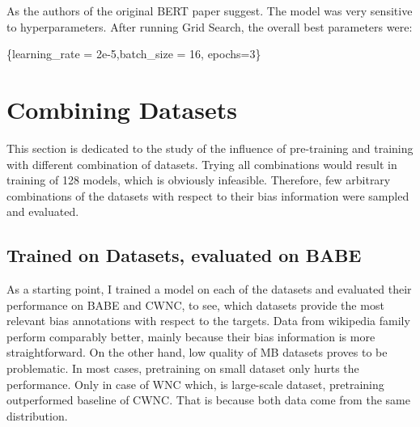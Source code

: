  As the authors of the original BERT paper suggest. The model was very sensitive to hyperparameters. After running Grid Search, the overall best parameters were:
 \begin{center}
      \{learning\_rate = 2e-5,batch\_size = 16, epochs=3\}
 \end{center}


 
 
 
 \section{Combining Datasets}
This section is dedicated to the study of the influence of pre-training and training with different combination of datasets. Trying all combinations would result in training of 128 models, which is obviously infeasible. Therefore, few arbitrary combinations of the datasets with respect to their bias information were sampled and evaluated.
 
 
 
 
 
 \subsection{Trained on Datasets, evaluated on BABE}
 As a starting point, I trained a model on each of the datasets and evaluated their performance on BABE and CWNC, to see, which datasets provide the most relevant bias annotations with respect to the targets. Data from wikipedia family perform comparably better, mainly because their bias information is more straightforward. On the other hand, low quality of MB datasets proves to be problematic. In most cases, pretraining on small dataset only hurts the performance. Only in case of WNC which, is large-scale dataset, pretraining outperformed baseline of CWNC. That is because both data come from the same distribution.
 
 
 
 
 
